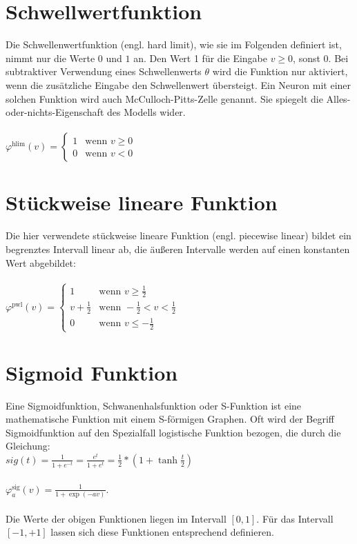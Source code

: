 \section{Schwellwertfunktion}
Die Schwellenwertfunktion (engl. hard limit), wie sie im Folgenden definiert ist, nimmt nur die Werte
${\displaystyle 0}$ und
${\displaystyle 1}$ an. Den Wert 1 für die Eingabe
${\displaystyle v\geq 0}$, sonst 
${\displaystyle 0}$. Bei subtraktiver Verwendung eines Schwellenwerts
${\displaystyle \theta }$ wird die Funktion nur aktiviert, wenn die zusätzliche Eingabe den Schwellenwert übersteigt. Ein Neuron mit einer solchen Funktion wird auch McCulloch-Pitts-Zelle genannt. Sie spiegelt die Alles-oder-nichts-Eigenschaft des Modells wider.\\
\\
${\displaystyle \varphi ^{\mbox{hlim}}(v)={\begin{cases}1&{\mbox{wenn }}v\geq 0\\0&{\mbox{wenn }}v<0\end{cases}}}$ 

\section{Stückweise lineare Funktion}
Die hier verwendete stückweise lineare Funktion (engl. piecewise linear) bildet ein begrenztes Intervall linear ab, die äußeren Intervalle werden auf einen konstanten Wert abgebildet:\\
\\
${\displaystyle \varphi ^{\mbox{pwl}}(v)={\begin{cases}1&{\mbox{wenn }}v\geq {\frac {1}{2}}\\v+{\frac {1}{2}}&{\mbox{wenn }}-{\frac {1}{2}}<v<{\frac {1}{2}}\\0&{\mbox{wenn }}v\leq -{\frac {1}{2}}\end{cases}}}$

\section{Sigmoid Funktion}
Eine Sigmoidfunktion, Schwanenhalsfunktion oder S-Funktion ist eine mathematische Funktion mit einem
S-förmigen Graphen.
Oft wird der Begriff Sigmoidfunktion auf den Spezialfall logistische Funktion bezogen,
die durch die Gleichung:\\
{\Large{$sig(t) = \frac{1}{1+e^{-t}} = \frac{e^t}{1 + e^t} = \frac{1}{2}*(1 + \tanh \frac{t}{2})$}}\\
\\
${\displaystyle \varphi _{a}^{\mbox{sig}}(v)={\frac {1}{1+\exp(-av)}}.}$ \\ 
\\
Die Werte der obigen Funktionen liegen im Intervall ${\displaystyle [0,1]}$. Für das Intervall ${\displaystyle [-1,+1]}$ lassen sich diese Funktionen entsprechend definieren.

